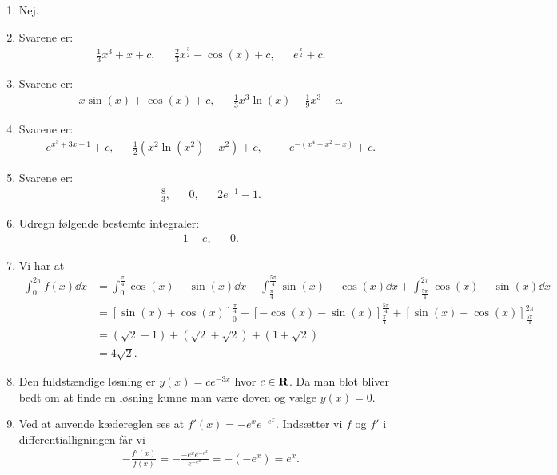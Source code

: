 \begin{enumerate}
	
	\item Nej.
	

	\item Svarene er:
	\begin{align*}
	\frac{1}{3}x^3+x+c,&& \frac{2}{3}x^{\frac{3}{2}}-\cos(x)+c,&& e^{\frac{x}{2}}+c.
	\end{align*}

	\item Svarene er:
	\begin{align*}
	x\sin(x)+\cos(x)+c,&& \frac{1}{3}x^3\ln(x)-\frac{1}{9}x^3+c.
	\end{align*}
	
	\item Svarene er:
	\begin{align*}
	e^{x^3+3x-1}+c,&& \frac{1}{2}(x^2\ln(x^2)-x^2)+c, && -e^{-(x^4+x^2-x)}+c.
	\end{align*}
	
	\item Svarene er:
	\begin{align*}
	\frac{8}{3},&& 0,&& 2e^{-1}-1.
	\end{align*}
	
	\item Udregn følgende bestemte integraler:
	\begin{align*}
	1-e,&& 0.
	\end{align*}
	
	\item\label{it:rep2} Vi har at
	\begin{align*}
	\int_0^{2\pi} f(x)\dd x&=\int_0^{\frac{\pi}{4}} \cos(x)-\sin(x) \dd x+\int_{\frac{\pi}{4}}^{\frac{5\pi}{4}} \sin(x)-\cos(x)\dd x+\int_{\frac{5\pi}{4}}^{2\pi} \cos(x)-\sin(x)\dd x\\
	&=[\sin(x)+\cos(x)]_{0}^{\frac{\pi}{4}}+[-\cos(x)-\sin(x)]_{\frac{\pi}{4}}^{\frac{5\pi}{4}}+[\sin(x)+\cos(x)]_{\frac{5\pi}{4}}^{2\pi}\\
	&=(\sqrt{2}-1)+(\sqrt{2}+\sqrt{2})+(1+\sqrt{2})\\
	&=4\sqrt{2}.
	\end{align*}
	
	\item Den fuldstændige løsning er $y(x)=ce^{-3x}$ hvor $c\in \mathbf{R}$. Da man blot bliver bedt om at finde en løsning kunne man være doven og vælge $y(x)=0$.
	
	\item Ved at anvende kædereglen ses at $ f'(x)=-e^x e^{-e^x} $. Indsætter vi $f$ og $f'$ i differentialligningen får vi
	\begin{align*}
	-\frac{f'(x)}{f(x)}=-\frac{-e^xe^{-e^x}}{e^{-e^x}}=-(-e^x)=e^x.
	\end{align*}
	

\end{enumerate}
